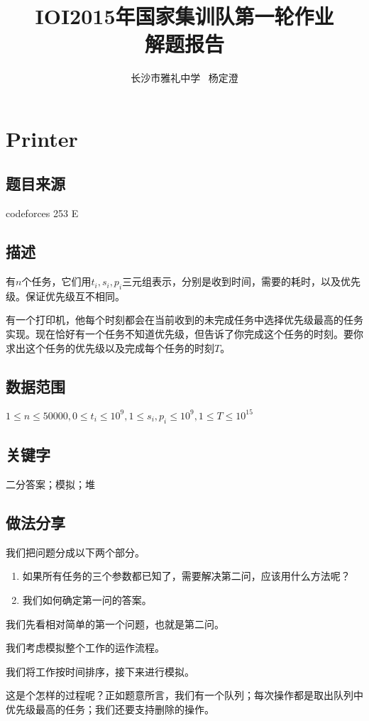 \documentclass{ctexart}
\begin{document}
	\title{\textbf{IOI2015年国家集训队第一轮作业\\解题报告}}
	\author{长沙市雅礼中学 \ 杨定澄}
	\maketitle
	\tableofcontents
\newpage
	\section{Printer}
		\subsection{题目来源}
			codeforces 253 E
		\subsection{描述}
			有$n$个任务，它们用$t_i,s_i,p_i$三元组表示，分别是收到时间，需要的耗时，以及优先级。保证优先级互不相同。

			有一个打印机，他每个时刻都会在当前收到的未完成任务中选择优先级最高的任务实现。现在恰好有一个任务不知道优先级，但告诉了你完成这个任务的时刻。要你求出这个任务的优先级以及完成每个任务的时刻$T$。
		\subsection{数据范围}
			$1 \le n \le 50000,0\le t_i \le 10^9,1 \le s_i,p_i \le 10^9,1 \le T \le 10^{15}$
		\subsection{关键字}
			二分答案；模拟；堆
		\subsection{做法分享}
			我们把问题分成以下两个部分。
				
			\begin{enumerate}
				\item 如果所有任务的三个参数都已知了，需要解决第二问，应该用什么方法呢？
				\item 我们如何确定第一问的答案。
			\end{enumerate}
				
			我们先看相对简单的第一个问题，也就是第二问。

			我们考虑模拟整个工作的运作流程。

			我们将工作按时间排序，接下来进行模拟。

			这是个怎样的过程呢？正如题意所言，我们有一个队列；每次操作都是取出队列中优先级最高的任务；我们还要支持删除的操作。
\end{document}

